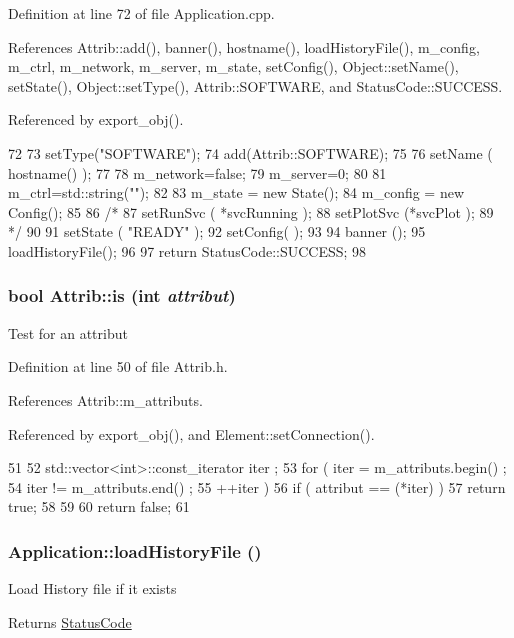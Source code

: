 Definition at line 72 of file Application.cpp.

References Attrib::add(), banner(), hostname(), loadHistoryFile(), m\_\-config, m\_\-ctrl, m\_\-network, m\_\-server, m\_\-state, setConfig(), Object::setName(), setState(), Object::setType(), Attrib::SOFTWARE, and StatusCode::SUCCESS.

Referenced by export\_\-obj().


\begin{DoxyCode}
72                                      {
73   setType("SOFTWARE");
74   add(Attrib::SOFTWARE);
75 
76   setName ( hostname() );
77 
78   m_network=false;
79   m_server=0;
80 
81   m_ctrl=std::string("");
82 
83   m_state  = new State();
84   m_config = new Config();
85 
86   /*
87     setRunSvc ( *svcRunning );
88     setPlotSvc (*svcPlot );
89   */
90 
91   setState ( "READY" );
92   setConfig( );
93 
94   banner  ();
95   loadHistoryFile();
96 
97   return StatusCode::SUCCESS;
98 }
\end{DoxyCode}
\hypertarget{classAttrib_a704f26af560909ad22065083bb7d4c34}{
\subsubsection[{is}]{\setlength{\rightskip}{0pt plus 5cm}bool Attrib::is (int {\em attribut})}}
\label{classAttrib_a704f26af560909ad22065083bb7d4c34}
Test for an attribut 

Definition at line 50 of file Attrib.h.

References Attrib::m\_\-attributs.

Referenced by export\_\-obj(), and Element::setConnection().


\begin{DoxyCode}
51   {
52     std::vector<int>::const_iterator iter ;
53     for ( iter  = m_attributs.begin() ;
54           iter != m_attributs.end()   ;
55           ++iter ) {
56       if ( attribut == (*iter) ) {
57         return true;
58       }
59     }
60     return false;
61   }
\end{DoxyCode}
\hypertarget{classApplication_ab5d46fc4784a4c821e974f5a47ec933d}{
\subsubsection[{loadHistoryFile}]{ Application::loadHistoryFile ()}}
\label{classApplication_ab5d46fc4784a4c821e974f5a47ec933d}
Load History file if it exists \begin{DoxyReturn}{Returns}
\hyperlink{classStatusCode}{StatusCode} 
\end{DoxyReturn}



